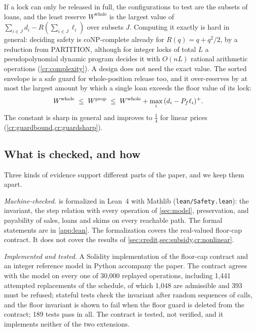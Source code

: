 If a lock can only be released in full, the configurations to test are the subsets of loans, and the least reserve $W^{\mathrm{whole}}$ is the largest value of $\sum_{i\in J}d_i-R(\sum_{i\in J}\ell_i)$ over subsets $J$. Computing it exactly is hard in general: deciding safety is coNP-complete already for $R(q)=q+q^2/2$, by a reduction from PARTITION, although for integer locks of total $L$ a pseudopolynomial dynamic program decides it with $O(nL)$ rational arithmetic operations (\cref{cr:complexity}). A design does not need the exact value. The sorted envelope is a safe guard for whole-position release too, and it over-reserves by at most the largest amount by which a single loan exceeds the floor value of its lock:
\[
W^{\mathrm{whole}}\;\le\;W^{\mathrm{prop}}\;\le\;W^{\mathrm{whole}}+\max_i\,(d_i-P_f\ell_i)^+ .
\]
The constant is sharp in general and improves to $\tfrac14$ for linear prices (\cref{cr:guardbound,cr:guardsharp}).

\subsection{What is checked, and how}\label{sec:evidence}

Three kinds of evidence support different parts of the paper, and we keep them apart.

\emph{Machine-checked.}  is formalized in Lean~4 with Mathlib (\texttt{lean/Safety.lean}): the invariant, the step relation with every operation of \cref{sec:model}, preservation, and payability of sales, loans and skims on every reachable path. The formal statements are in \cref{app:lean}. The formalization covers the real-valued floor-cap contract. It does not cover the results of \cref{sec:credit,sec:subsidy,cr:nonlinear}.

\emph{Implemented and tested.} A Solidity implementation of the floor-cap contract and an integer reference model in Python accompany the paper. The contract agrees with the model on every one of 30{,}000 replayed operations, including 1{,}441 attempted replacements of the schedule, of which 1{,}048 are admissible and 393 must be refused; stateful tests check the invariant after random sequences of calls, and the floor invariant is shown to fail when the floor guard is deleted from the contract; 189 tests pass in all. The contract is tested, not verified, and it implements neither of the two extensions.

